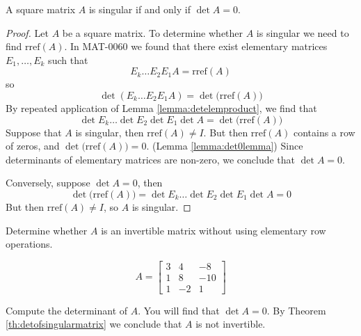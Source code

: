\documentclass{ximera}
\begin{document}
\begin{theorem}\label{th:detofsingularmatrix}
A square matrix $A$ is singular if and only if $\det{A}=0$.
\end{theorem}
\begin{proof}
Let $A$ be a square matrix.  To determine whether $A$ is singular we need to find $\mbox{rref}(A)$.  In MAT-0060 we found that there exist elementary matrices $E_1,\ldots ,E_k$ such that 
$$E_k\ldots E_2E_1A=\mbox{rref}(A)$$
so
$$\det{(E_k\ldots E_2E_1A)}=\det{\big(\mbox{rref}(A)\big)}$$
By repeated application of Lemma \ref{lemma:detelemproduct}, we find that 
$$\det{E_k}\ldots \det{E_2}\det{E_1}\det{A}=\det{\big(\mbox{rref}(A)\big)}$$
Suppose that $A$ is singular, then $\mbox{rref}(A)\neq I$.  But then $\mbox{rref}(A)$ contains a row of zeros, and $\det{\big(\mbox{rref}(A)\big)}=0$. (Lemma \ref{lemma:det0lemma})  Since determinants of elementary matrices are non-zero, we conclude that $\det{A}=0$.

Conversely, suppose $\det{A}=0$, then
$$\det{\big(\mbox{rref}(A)\big)}=\det{E_k}\ldots \det{E_2}\det{E_1}\det{A}=0$$
But then $\mbox{rref}(A)\neq I$, so $A$ is singular.
\end{proof}
\begin{example}\label{ex:invanddet} Determine whether $A$ is an invertible matrix without using elementary row operations.

$$A=\begin{bmatrix}3&4&-8\\1&8&-10\\1&-2&1\end{bmatrix}$$
\begin{explanation}
Compute the determinant of $A$.  You will find that $\det{A}=0$.  By Theorem \ref{th:detofsingularmatrix} we conclude that $A$ is not invertible.
\end{explanation}
\end{example}
\end{document}
